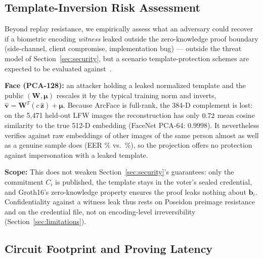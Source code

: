 \documentclass[10pt,letterpaper,journal]{IEEEtran}
\begin{document}
\subsection{Template-Inversion Risk Assessment}
\label{subsec:eval_inversion}

Beyond replay resistance, we empirically assess what an adversary could recover if a biometric encoding \emph{witness} leaked outside the zero-knowledge proof boundary (side-channel, client compromise, implementation bug) — outside the threat model of Section~\ref{sec:security}, but a scenario template-protection schemes are expected to be evaluated against~\cite{ISO24745}.

\textbf{Face (PCA-128):} an attacker holding a leaked normalized template and the public $(\mathbf{W}, \boldsymbol{\mu})$ rescales it by the typical training norm and inverts, $\hat{\mathbf{v}} = \mathbf{W}^T(c\,\hat{\mathbf{z}}) + \boldsymbol{\mu}$. Because ArcFace is full-rank, the 384-D complement is lost: on the 5,471 held-out LFW images the reconstruction has only $0.72$ mean cosine similarity to the true 512-D embedding (FaceNet PCA-64: $0.9998$). It nevertheless verifies against raw embeddings of other images of the same person almost as well as a genuine sample does (EER \nInvEer\% vs.\ \nInvRawEer\%), so the projection offers no protection against impersonation with a leaked template.

\textbf{Scope:} This does not weaken Section~\ref{sec:security}'s guarantees: only the commitment $C_i$ is published, the template stays in the voter's sealed credential, and Groth16's zero-knowledge property ensures the proof leaks nothing about $\mathbf{b}_i$. Confidentiality against a witness leak thus rests on Poseidon preimage resistance and on the credential file, not on encoding-level irreversibility (Section~\ref{sec:limitations}).

\subsection{Circuit Footprint and Proving Latency}
\label{subsec:eval_circuit_benchmarks}
\end{document}
